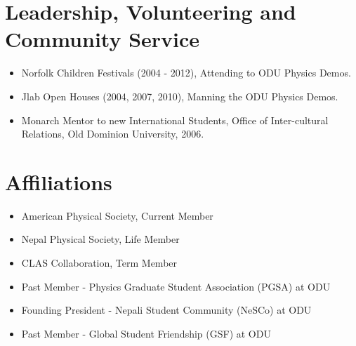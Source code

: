 \documentclass[10pt, letterpaper]{article}
\begin{document}
\section*{Leadership, Volunteering and Community Service}
\noindent
\begin{itemize}
\item Norfolk Children Festivals (2004 - 2012), Attending to ODU Physics Demos.
\item Jlab Open Houses (2004, 2007, 2010), Manning the ODU Physics Demos.
\item Monarch Mentor to new International Students, Office of Inter-cultural Relations, Old Dominion University, 2006. %
\end{itemize}


\section*{Affiliations}
\noindent
\begin{itemize}
  \item American Physical Society, Current Member 
  \item Nepal Physical Society, Life Member %
  \item CLAS Collaboration, Term Member %
  \item Past Member - Physics Graduate Student Association (PGSA) at ODU
  \item Founding President - Nepali Student Community (NeSCo) at ODU
  \item Past Member - Global Student Friendship (GSF) at ODU
\end{itemize}
\end{document}
